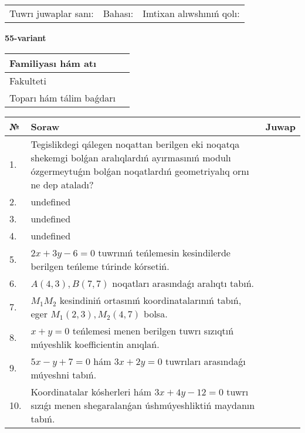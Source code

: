 \documentclass{article}
\begin{document}
\vspace{0.7cm}

\begin{tabular}{lll}
Tuwrı juwaplar sanı: \underline{\hspace{1cm}} & 
Bahası: \underline{\hspace{1cm}} & 
Imtixan alıwshınıń qolı: \underline{\hspace{2cm}} \\
\end{tabular}

\egroup

\newpage


\textbf{55-variant}\\

\bgroup
\def\arraystretch{1.6} %

\begin{tabular}{|m{5.7cm}|m{9.5cm}|}
\hline
Familiyası hám atı & \\
\hline
Fakulteti  & \\
\hline
Toparı hám tálim baǵdarı  & \\
\hline
\end{tabular}

\vspace{0.7cm}

\begin{tabular}{|m{0.7cm}|m{10cm}|m{4cm}|}
\hline
№ & Soraw & Juwap \\
\hline
1. & Tegislikdegi qálegen noqattan berilgen eki noqatqa shekemgi bolǵan aralıqlardıń ayırmasınıń modulı ózgermeytuǵın bolǵan noqatlardıń geometriyalıq ornı ne dep ataladı? &  \\
\hline
2. & undefined &  \\
\hline
3. & undefined &  \\
\hline
4. & undefined &  \\
\hline
5. & \(2 x + 3 y - 6 = 0\) tuwrınıń teńlemesin kesindilerde berilgen teńleme túrinde kórsetiń. &  \\
\hline
6. & \(A (4, 3), B (7, 7)\) noqatları arasındaǵı aralıqtı tabıń. &  \\
\hline
7. & \(M_{1}M_{2}\) kesindiniń ortasınıń koordinatalarınıń tabıń, eger \(M_{1} (2, 3), M_{2} (4, 7)\) bolsa. &  \\
\hline
8. & \(x + y = 0\) teńlemesi menen berilgen tuwrı sızıqtıń múyeshlik koefficientin anıqlań. &  \\
\hline
9. & \(5 x - y + 7 = 0\) hám \(3 x + 2 y = 0\) tuwrıları arasındaǵı múyeshni tabıń. &  \\
\hline
10. & Koordinatalar kósherleri hám \( 3 x + 4 y - 12 = 0 \) tuwrı sızıǵı menen shegaralanǵan úshmúyeshliktiń maydanın tabıń. & \\
\hline
\end{tabular}
\end{document}
